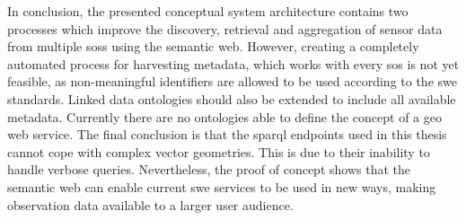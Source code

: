In conclusion, the presented conceptual system architecture contains two processes which improve the discovery, retrieval and aggregation of sensor data from multiple \aclp*{sos} using the semantic web. However, creating a completely automated process for harvesting metadata, which works with every \acl*{sos} is not yet feasible, as non-meaningful identifiers are allowed to be used according to the \acs*{swe} standards. Linked data ontologies should also be extended to include all available metadata. Currently there are no ontologies able to define the concept of a geo web service. The final conclusion is that the \acs*{sparql} endpoints used in this thesis cannot cope with complex vector geometries. This is due to their inability to handle verbose queries. Nevertheless, the proof of concept shows that the semantic web can enable current \ac{swe} services to be used in new ways, making observation data available to a larger user audience.  